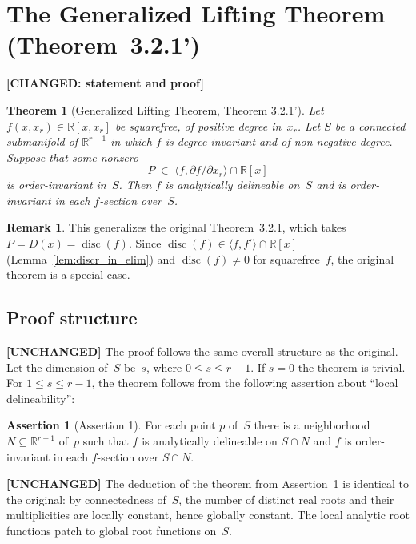 \documentclass[11pt]{article}
\theoremstyle{plain}
\newtheorem{theorem}{Theorem}[section]
\theoremstyle{definition}
\newtheorem*{remark}{Remark}
\newtheorem*{assertion}{Assertion}
\newcommand{\R}{\mathbb{R}}
\DeclareMathOperator{\disc}{disc}
\begin{document}
\section{The Generalized Lifting Theorem (Theorem~3.2.1')}
\label{sec:lifting}

\textbf{[CHANGED: statement and proof]}

\begin{theorem}[Generalized Lifting Theorem, Theorem 3.2.1']
\label{thm:gen_lifting}
Let $f(x, x_r) \in \R[x, x_r]$ be squarefree, of positive degree
in~$x_r$.  Let $S$ be a connected submanifold of\/ $\R^{r-1}$ in which
$f$ is degree-invariant and of non-negative degree.  Suppose that some
nonzero
\[
  P \;\in\; \langle f, \partial f / \partial x_r \rangle \cap \R[x]
\]
is order-invariant in~$S$.  Then $f$ is analytically delineable on~$S$
and is order-invariant in each $f$-section over~$S$.
\end{theorem}

\begin{remark}
This generalizes the original Theorem~3.2.1, which takes
$P = D(x) = \disc(f)$.  Since $\disc(f) \in \langle f, f' \rangle \cap \R[x]$
(Lemma~\ref{lem:discr_in_elim}) and $\disc(f) \ne 0$ for squarefree~$f$,
the original theorem is a special case.
\end{remark}

\subsection{Proof structure}
\label{ssec:proof_structure}

\textbf{[UNCHANGED]} The proof follows the same overall structure as the
original.  Let the dimension of~$S$ be~$s$, where $0 \le s \le r-1$.
If $s = 0$ the theorem is trivial.  For $1 \le s \le r-1$, the theorem
follows from the following assertion about ``local delineability'':

\begin{assertion}[Assertion 1]
For each point $p$ of~$S$ there is a neighborhood
$N \subseteq \R^{r-1}$ of~$p$ such that $f$ is analytically delineable on
$S \cap N$ and $f$ is order-invariant in each $f$-section over $S \cap N$.
\end{assertion}

\textbf{[UNCHANGED]}
The deduction of the theorem from Assertion~1 is identical to the
original: by connectedness of~$S$, the number of distinct real roots
and their multiplicities are locally constant, hence globally constant.
The local analytic root functions patch to global root functions on~$S$.
\end{document}
